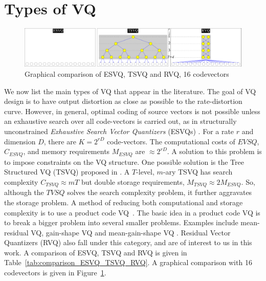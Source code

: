 \section{Types of VQ}
\label{sec:types_VQ}

								\begin{figure}[htp]				
								\includegraphics[width=1.1\textwidth]{thesis/RVQ_comparisonWithESVQ_TSVQ.pdf}
								\caption{Graphical comparison of ESVQ, TSVQ and RVQ, 16 codevectors}
								\label{fig:comparison_ESVQ_TSVQ_RVQ}
								\end{figure}


We now list the main types of VQ that appear in the literature.  The goal of VQ design is to have output distortion as close as possible to the rate-distortion curve.  However, in general, optimal coding of source vectors is not possible unless an exhaustive search over all code-vectors is carried out, as in structurally unconstrained \emph{Exhaustive Search Vector Quantizers} (ESVQs) \cite{1992_JNL_RVQ_Barnes}.  For a rate $r$ and dimension $D$, there are $K=2^{rD}$ code-vectors.  The computational costs of $EVSQ$, $C_{ESVQ}$, and memory requirements $M_{ESVQ}$ are $\approx 2^{rD}$.  A solution to this problem is to impose constraints on the VQ structure.  One possible solution is the Tree Structured VQ (TSVQ) proposed in \cite{1980_JNL_TSVQ_Buzo}.  A $T$-level, $m$-ary TSVQ has search complexity $C_{TSVQ} \approx mT$ but double storage requirements, $M_{TSVQ} \approx 2 M_{ESVQ}$.   So, although the $TVSQ$ solves the search complexity problem, it further aggravates the storage problem.  A method of reducing both computational and storage complexity is to use a product code VQ~\cite{1991_BOOK_VQ_GershoGray}.  The basic idea in a product code VQ is to break a bigger problem into several smaller problems.  Examples include mean-residual VQ, gain-shape VQ and mean-gain-shape VQ \cite{1996_JNL_AdvancesRVQ_Barnes}.  Residual Vector Quantizers (RVQ) also fall under this category, and are of interest to us in this work.  A comparison of ESVQ, TSVQ and RVQ is given in Table~\ref{tab:comparison_ESVQ_TSVQ_RVQ}.  A graphical comparison with 16 codevectors is given in Figure~\ref{fig:comparison_ESVQ_TSVQ_RVQ}.

